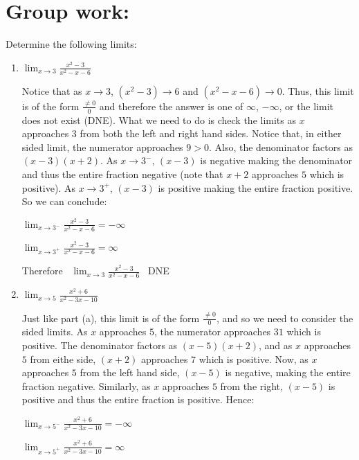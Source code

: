 \documentclass[handout,nooutcomes]{ximera}
\begin{document}
\section*{Group work:}

\begin{problem}
Determine the following limits:
	\begin{enumerate}
			
	\item  $\lim_{x \to 3} \frac{x^2 - 3}{x^2 - x - 6}   $
		\begin{freeResponse}
		Notice that as $x \to 3$, $(x^2 - 3) \to 6$ and $(x^2 - x - 6) \to 0$.  Thus, this limit is of the form $\frac{\neq 0}{0}$ and therefore the answer is one of $\infty$, $-\infty$, or the limit does not exist (DNE).  What we need to do is check the limits as $x$ approaches $3$ from both the left and right hand sides.  Notice that, in either sided limit, the numerator approaches $9 > 0$.  Also, the denominator factors as $(x-3)(x+2)$.  As $x \to 3^-$, $(x-3)$ is negative making the denominator and thus the entire fraction negative (note that $x+2$ approaches $5$ which is positive).  As $x \to 3^+$, $(x-3)$ is positive making the entire fraction positive.  So we can conclude: 
		
		$ \lim_{x \to 3^-} \frac{x^2 - 3}{x^2 - x - 6} = -\infty$
		
		$ \lim_{x \to 3^+} \frac{x^2 - 3}{x^2 - x - 6} = \infty$
		
		Therefore \, $ \lim_{x \to 3} \frac{x^2 - 3}{x^2 - x - 6}$ \, DNE
		\end{freeResponse}
			
			
			
	\item  $\lim_{x \to 5} \frac{x^2 + 6}{x^2 - 3x - 10}   $
		\begin{freeResponse}
		Just like part (a), this limit is of the form $\frac{\neq 0}{0}$, and so we need to consider the sided limits.  As $x$ approaches $5$, the numerator approaches $31$ which is positive.  The denominator factors as $(x-5)(x+2)$, and as $x$ approaches $5$ from eithe side, $(x+2)$ approaches $7$ which is positive.  Now, as $x$ approaches $5$ from the left hand side, $(x-5)$ is negative, making the entire fraction negative.  Similarly, as $x$ approaches $5$ from the right, $(x-5)$ is positive and thus the entire fraction is positive.  Hence:
		
		$ \lim_{x \to 5^-} \frac{x^2 + 6}{x^2 - 3x - 10} = -\infty$
		
		$ \lim_{x \to 5^+} \frac{x^2 + 6}{x^2 - 3x - 10} = \infty$
		

\end{freeResponse}
\end{enumerate}
\end{problem}
\end{document}
